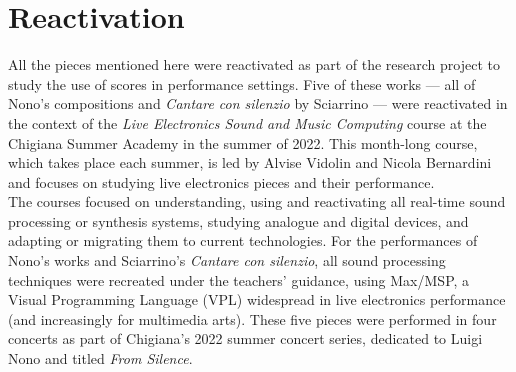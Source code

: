 \section{Reactivation}
All the pieces mentioned here were reactivated as part of the research project to study the use of scores in performance settings. Five of these works — all of Nono's compositions and \textit{Cantare con silenzio} by Sciarrino — were reactivated in the context of the \textit{Live Electronics Sound and Music Computing} course at the Chigiana Summer Academy in the summer of 2022. This month-long course, which takes place each summer, is led by Alvise Vidolin and Nicola Bernardini and focuses on studying live electronics pieces and their performance.\\
The courses focused on understanding, using and reactivating all real-time sound processing or synthesis systems, studying analogue and digital devices, and adapting or migrating them to current technologies. For the performances of Nono's works and Sciarrino's \textit{Cantare con silenzio}, all sound processing techniques were recreated under the teachers' guidance, using Max/MSP, a Visual Programming Language (VPL) widespread in live electronics performance (and increasingly for multimedia arts). These five pieces were performed in four concerts as part of Chigiana's 2022 summer concert series, dedicated to Luigi Nono and titled \textit{From Silence}.

